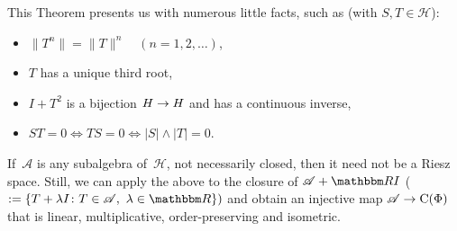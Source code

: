 \documentclass[main.tex]{subfiles}
\begin{document}
\noindent This Theorem presents us with numerous little facts,
such as (with $S,T\in\mathscr H$):
\begin{itemize}
\item $\|T^n\| = \|T\|^n\quad(n=1,2,\dotsc)$,
\item $T$ has a unique third root,
\item $I+T^2$ is a bijection $H\rightarrow H$
and has a continuous inverse,
\item $ST=0\iff TS=0\iff |S|\wedge|T|=0$.
\end{itemize}
If~$\mathscr A$ is any subalgebra of~$\mathscr H$,
not necessarily closed,
then it need not be a Riesz space.
Still, we can apply the above to the closure of
$\mathscr A+\R I$ ($:=\{T+\lambda I\colon T\in\mathscr A,\  \lambda\in\R\})$
and obtain an injective map $\mathscr A\rightarrow\mathrm{C}(\Phi)$
that is linear, multiplicative, order-preserving and isometric.
\end{document}
